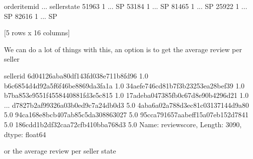\documentclass[letterpaper,10pt,english]{jupyterBook}
\begin{document}
\begin{sphinxVerbatim}[commandchars=\\\{\}]
       order\PYGZus{}item\PYGZus{}id  ... seller\PYGZus{}state
51963              1  ...           SP
53184              1  ...           SP
81465              1  ...           SP
25922              1  ...           SP
82616              1  ...           SP

[5 rows x 16 columns]
\end{sphinxVerbatim}

\sphinxAtStartPar
We can do a lot of things with this, an option is to get the average review per seller

\begin{sphinxVerbatim}[commandchars=\\\{\}]
\PYG{p}{[}\PYG{p}{]}
\end{sphinxVerbatim}

\begin{sphinxVerbatim}[commandchars=\\\{\}]
seller\PYGZus{}id
6d04126aba80df143fd038e711b8fd96    1.0
b6c6854d4d92a5f6f46be8869da3fa1a    1.0
34aefe746cd81b7f3b23253ea28bef39    1.0
b7ba853e9551f4558440881fd3e5c815    1.0
17adeba047385fb0c67d8e90b4296d21    1.0
                                   ... 
d7827b2af99326a03b0ed9c7a24db0d3    5.0
4aba6a02a788d3ec81c03137144d9a80    5.0
94ca168e8bcb407ab85c5da308863027    5.0
95cca791657aabeff15a07eb152d7841    5.0
186cdd1b2df32caa72cfb410bba768d3    5.0
Name: review\PYGZus{}score, Length: 3090, dtype: float64
\end{sphinxVerbatim}

\sphinxAtStartPar
or the average review per seller state

\begin{sphinxVerbatim}[commandchars=\\\{\}]
\PYG{p}{[}\PYG{p}{]}
\end{sphinxVerbatim}
\end{document}
